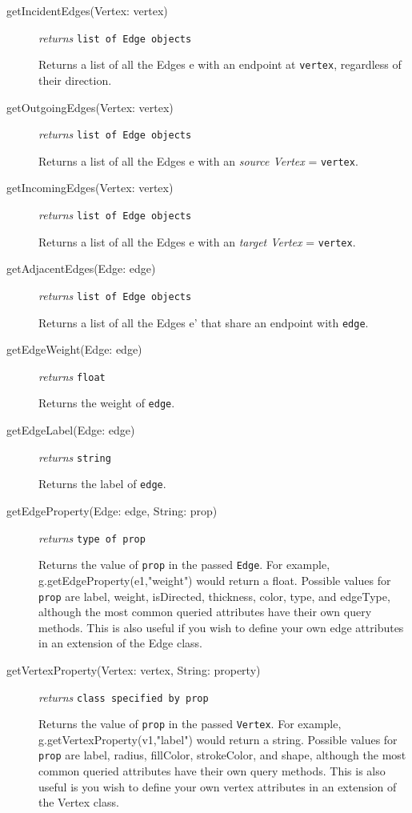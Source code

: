 \documentclass{article}
\newcounter{example}
\newlength\q
\begin{document}
\begin{description}
\item[getIncidentEdges(Vertex: vertex)]\emph{returns}
  \texttt{list of Edge objects}

Returns a list of all the Edges e with an endpoint at \texttt{vertex}, regardless of their direction.

\item[getOutgoingEdges(Vertex: vertex)]\emph{returns}
  \texttt{list of Edge objects}

Returns a list of all the Edges e with an \textit{source Vertex} = \texttt{vertex}.

\item[getIncomingEdges(Vertex: vertex)]\emph{returns}
  \texttt{list of Edge objects}

Returns a list of all the Edges e with an \textit{target Vertex} = \texttt{vertex}.

\item[getAdjacentEdges(Edge: edge)]\emph{returns}
  \texttt{list of Edge objects}

Returns a list of all the Edges e' that share an endpoint with \texttt{edge}.

\item[getEdgeWeight(Edge: edge)]\emph{returns}
  \texttt{float}

Returns the weight of \texttt{edge}.

\item[getEdgeLabel(Edge: edge)]\emph{returns}
  \texttt{string}

 Returns the label of \texttt{edge}.

\item[getEdgeProperty(Edge: edge, String: prop)]\emph{returns}
  \texttt{type of prop}

Returns the value of \texttt{prop} in the passed \texttt{Edge}. For example, g.getEdgeProperty(e1,"weight") would return a float. Possible values for \texttt{prop} are label, weight, isDirected, thickness, color, type, and edgeType, although the most common queried attributes have their own query methods. This is also useful if you wish to define your own edge attributes in an extension of the Edge class.

\item[getVertexProperty(Vertex: vertex, String: property)]\emph{returns}
  \texttt{class specified by prop}

Returns the value of \texttt{prop} in the passed \texttt{Vertex}. For example, g.getVertexProperty(v1,"label") would return a string. Possible values for \texttt{prop} are label, radius, fillColor, strokeColor, and shape, although the most common queried attributes have their own query methods. This is also useful is you wish to define your own vertex attributes in an extension of the Vertex class.


\end{description}
\end{document}

